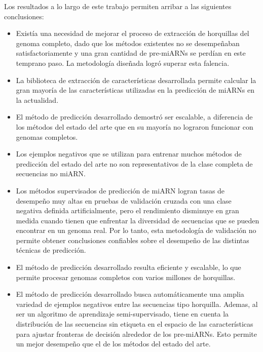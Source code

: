 Los resultados a lo largo de este trabajo permiten arribar a las siguientes conclusiones:
\begin{itemize}
\item Existía una necesidad de mejorar el proceso de extracción de horquillas del genoma completo, dado que los métodos existentes no se desempeñaban
	satisfactoriamente y una gran cantidad de pre-miARNs se perdían en este temprano paso. La metodología diseñada logró superar esta falencia.
\item La biblioteca de extracción de características desarrollada permite calcular la gran mayoría de las características utilizadas en la predicción de miARNs
	en la actualidad.
\item El método de predicción desarrollado demostró ser escalable, a diferencia de los métodos del estado del arte que en su mayoría no lograron funcionar con
	genomas completos.
\item Los ejemplos negativos que se utilizan para entrenar muchos métodos de predicción del estado del arte no son representativos de la clase completa de
	secuencias no miARN.
\item Los métodos supervisados de predicción de miARN logran tasas de desempeño muy altas en pruebas de validación cruzada con una clase negativa definida
	artificialmente, pero el rendimiento disminuye en gran medida cuando tienen que enfrentar la diversidad de secuencias que se pueden encontrar en un
	genoma real. Por lo tanto, esta metodología de validación no permite obtener conclusiones confiables sobre el desempeño de las distintas técnicas de
	predicción.
\item El método de predicción desarrollado resulta eficiente y escalable, lo que permite procesar genomas completos con varios millones de horquillas.
\item El método de predicción desarrollado busca automáticamente una amplia variedad de ejemplos negativos entre las secuencias tipo horquilla. Ademas, al ser
	un algoritmo de aprendizaje semi-supervisado, tiene en cuenta la distribución de las secuencias sin etiqueta en el espacio de las características para
	ajustar fronteras de decisión alrededor de los pre-miARNs. Esto permite un mejor desempeño que el de los métodos del estado del arte.
\end{itemize}


